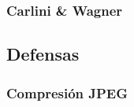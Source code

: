 \subsubsection{Carlini \& Wagner}
\cite{carlini2017evaluating} 

\subsection{Defensas}

\subsubsection{Compresión JPEG }
\cite{das2017keeping}